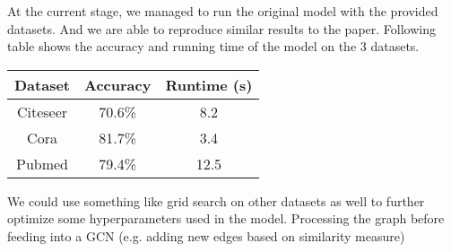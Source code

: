 \documentclass[11pt,a4paper]{article}
\begin{document}





At the current stage, we managed to run the original model with the provided datasets. And we are able to reproduce similar results to the paper. Following table shows the accuracy and running time of the model on the 3 datasets.

\begin{tabular}{|c|c|c|}
  \hline
  \textbf{Dataset} & \textbf{Accuracy} & \textbf{Runtime (s)} \\
  \hline
  Citeseer & 70.6\% & 8.2 \\
  Cora & 81.7\% & 3.4 \\
  Pubmed & 79.4\% & 12.5 \\
  \hline
\end{tabular}

We could use something like grid search on other datasets as well to further optimize some hyperparameters used in the model. Processing the graph before feeding into a GCN (e.g. adding new edges based on similarity measure)

\end{document}
